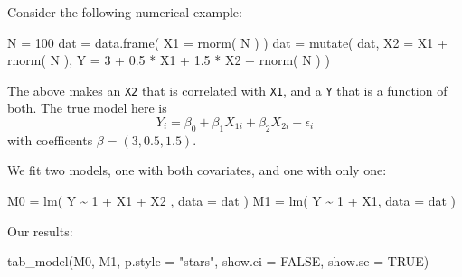 \documentclass[
  letterpaper,
  DIV=11,
  numbers=noendperiod]{scrreprt}
\newenvironment{Shaded}{\begin{snugshade}}{\end{snugshade}}
\newcommand{\AttributeTok}[1]{\textcolor[rgb]{0.49,0.56,0.16}{#1}}
\newcommand{\ConstantTok}[1]{\textcolor[rgb]{0.53,0.00,0.00}{#1}}
\newcommand{\DecValTok}[1]{\textcolor[rgb]{0.25,0.63,0.44}{#1}}
\newcommand{\FloatTok}[1]{\textcolor[rgb]{0.25,0.63,0.44}{#1}}
\newcommand{\FunctionTok}[1]{\textcolor[rgb]{0.02,0.16,0.49}{#1}}
\newcommand{\NormalTok}[1]{\textcolor[rgb]{0.00,0.44,0.13}{#1}}
\newcommand{\OtherTok}[1]{\textcolor[rgb]{0.00,0.44,0.13}{#1}}
\newcommand{\SpecialCharTok}[1]{\textcolor[rgb]{0.25,0.44,0.63}{#1}}
\newcommand{\StringTok}[1]{\textcolor[rgb]{0.25,0.44,0.63}{#1}}
\begin{document}
Consider the following numerical example:

\begin{Shaded}
\begin{Highlighting}[]
\NormalTok{N }\OtherTok{=} \DecValTok{100}
\NormalTok{dat }\OtherTok{=} \FunctionTok{data.frame}\NormalTok{( }\AttributeTok{X1 =} \FunctionTok{rnorm}\NormalTok{( N ) )}
\NormalTok{dat }\OtherTok{=} \FunctionTok{mutate}\NormalTok{( dat, }
              \AttributeTok{X2 =}\NormalTok{ X1 }\SpecialCharTok{+} \FunctionTok{rnorm}\NormalTok{( N ),}
              \AttributeTok{Y =} \DecValTok{3} \SpecialCharTok{+} \FloatTok{0.5} \SpecialCharTok{*}\NormalTok{ X1 }\SpecialCharTok{+} \FloatTok{1.5} \SpecialCharTok{*}\NormalTok{ X2 }\SpecialCharTok{+} \FunctionTok{rnorm}\NormalTok{( N ) )}
\end{Highlighting}
\end{Shaded}

The above makes an \texttt{X2} that is correlated with \texttt{X1}, and
a \texttt{Y} that is a function of both. The true model here is
\[ Y_i = \beta_0 + \beta_1 X_{1i} + \beta_2 X_{2i} + \epsilon_{i} \]
with coefficents \(\beta = (3, 0.5, 1.5)\).

We fit two models, one with both covariates, and one with only one:

\begin{Shaded}
\begin{Highlighting}[]
\NormalTok{M0 }\OtherTok{=} \FunctionTok{lm}\NormalTok{( Y }\SpecialCharTok{\textasciitilde{}} \DecValTok{1} \SpecialCharTok{+}\NormalTok{ X1 }\SpecialCharTok{+}\NormalTok{ X2 , }\AttributeTok{data =}\NormalTok{ dat )}
\NormalTok{M1 }\OtherTok{=} \FunctionTok{lm}\NormalTok{( Y }\SpecialCharTok{\textasciitilde{}} \DecValTok{1} \SpecialCharTok{+}\NormalTok{ X1, }\AttributeTok{data =}\NormalTok{ dat )}
\end{Highlighting}
\end{Shaded}

Our results:

\begin{Shaded}
\begin{Highlighting}[]
\FunctionTok{tab\_model}\NormalTok{(M0, M1, }\AttributeTok{p.style =} \StringTok{"stars"}\NormalTok{,}
          \AttributeTok{show.ci =} \ConstantTok{FALSE}\NormalTok{, }\AttributeTok{show.se =} \ConstantTok{TRUE}\NormalTok{)}
\end{Highlighting}
\end{Shaded}
\end{document}
